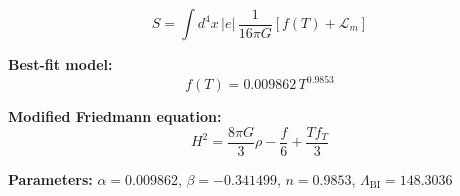 
\begin{equation}
  S = \int d^4x \, |e| \, \frac{1}{16\pi G} \left[ f(T) + \mathcal{L}_m \right]
\end{equation}

\textbf{Best-fit model:}
\begin{equation}
  f(T) = 0.009862 \, T^{0.9853}
\end{equation}

\textbf{Modified Friedmann equation:}
\begin{equation}
  H^2 = \frac{8\pi G}{3} \rho - \frac{f}{6} + \frac{T f_T}{3}
\end{equation}

\textbf{Parameters:}
$\alpha = 0.009862$, \quad
$\beta = -0.341499$, \quad
$n = 0.9853$, \quad
$\Lambda_{\text{BI}} = 148.3036$